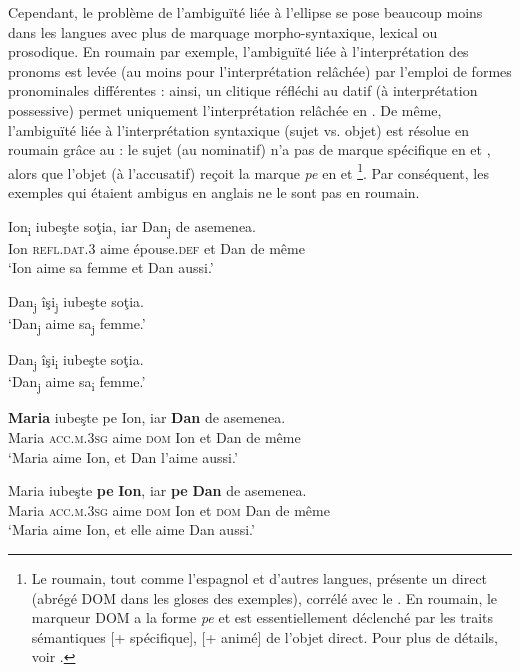 Cependant, le problème de l’ambiguïté liée à l’ellipse se pose beaucoup moins dans les langues avec plus de marquage morpho-syntaxique, lexical ou proso\-dique. En roumain par exemple, l’ambiguïté liée à l’interprétation des pronoms est levée (au moins pour l’interprétation relâchée) par l’emploi de formes prono\-minales différentes : ainsi, un clitique réfléchi au datif (à interprétation possessive) permet uniquement l’interprétation relâchée en . De même, l’ambiguïté liée à l’interprétation syntaxique (sujet vs. objet) est résolue en roumain grâce au  : le sujet (au nominatif) n’a pas de marque spécifique en  et , alors que l’objet (à l’accusatif) reçoit la marque \textit{pe} en  et \footnote{Le roumain, tout comme l’espagnol et d’autres langues, présente un  direct (abrégé DOM dans les gloses des exemples), corrélé avec le . En roumain, le marqueur DOM a la forme \textit{pe} et est essentiellement déclenché par les traits sémantiques [+ spécifique], [+ animé] de l’objet direct. Pour plus de détails, voir \citet{Mardale2010}.}. Par conséquent, les exemples qui étaient ambigus en anglais ne le sont pas en roumain. 

\ea \label{ch1:ex18}
\ea
\gll   Ion\textsubscript{i}   iubeşte soţia, iar  Dan\textsubscript{j}  de asemenea. \\
	Ion  \textsc{refl.dat.3}  aime  épouse.\textsc{def}  et  Dan  de même\\
\glt ‘Ion aime sa femme et Dan aussi.’ 

\ex  Dan\textsubscript{j} îşi\textsubscript{j} iubeşte soţia. \\
\glt ‘Dan\textsubscript{j} aime sa\textsubscript{j} femme.’ 

\ex  *Dan\textsubscript{j} îşi\textsubscript{i} iubeşte soţia. \\
\glt ‘Dan\textsubscript{j} aime sa\textsubscript{i} femme.’ 
\z
\z


\ea
\ea
\gll  \textbf{Maria}   iubeşte pe Ion,  iar  \textbf{Dan}  de asemenea.\label{ch1:ex19a} \\
Maria  \textsc{acc.m.3sg}  aime  \textsc{dom}  Ion  et  Dan  de même\\
\glt ‘Maria aime Ion, et Dan l’aime aussi.’ 

\ex  
\gll Maria   iubeşte \textbf{pe} \textbf{Ion}, iar  \textbf{pe} \textbf{Dan}  de asemenea. \label{ch1:ex19b}\\
Maria  \textsc{acc.m.3sg}  aime  \textsc{dom}  Ion  et  \textsc{dom}  Dan  de même\\
\glt ‘Maria aime Ion, et elle aime Dan aussi.’ 
\z
\z


